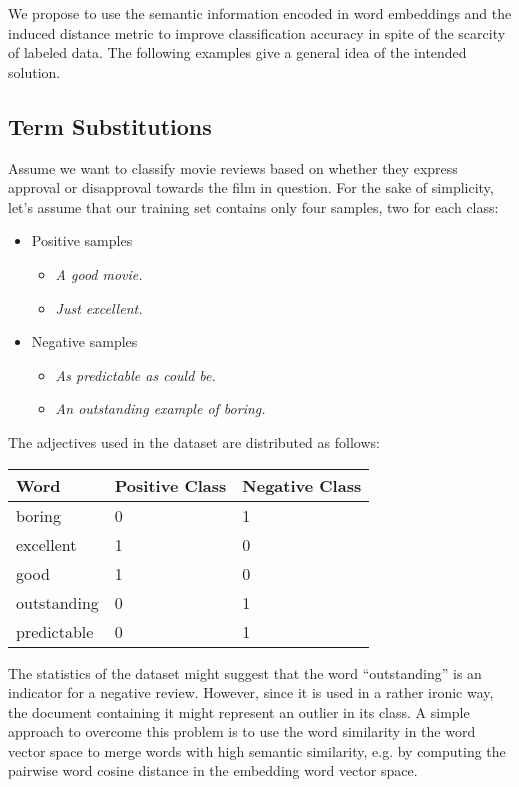 We propose to use the semantic information encoded in word embeddings and the
induced distance metric to improve classification accuracy in spite of the scarcity of labeled
data. The following examples give a general idea of the intended solution.

\subsection{Term Substitutions}
Assume we want to classify movie reviews based on whether they
express approval or disapproval towards the film in question. For the sake of
simplicity, let's assume that our training set contains only four samples, two
for each class:

\begin{itemize}
  \item Positive samples
  \begin{itemize}
	  \item \emph{A good movie.}
	  \item \emph{Just excellent.}
  \end{itemize}
  
  \item Negative samples
  \begin{itemize}
	  \item \emph{As predictable as could be.}
	  \item \emph{An outstanding example of boring.} 
  \end{itemize}
\end{itemize}

The adjectives used in the dataset are distributed as follows:

\begin{center}
\begin{tabular}{l|l|l}
\textbf{Word} & \textbf{Positive Class} & \textbf{Negative Class}  \\
\hline
boring & 0 & 1 \\
excellent & 1 & 0 \\
good & 1 & 0 \\
outstanding & 0 & 1 \\
predictable & 0 & 1 \\

\end{tabular}
\end{center}

The statistics of the dataset might suggest that the word ``outstanding'' is an
indicator for a negative review. However, since it is used in a rather ironic
way, the document containing it might represent an outlier in its class. A
simple approach to overcome this problem is to use the word similarity
in the word vector space to merge words with high semantic similarity, e.g. by
computing the pairwise word cosine distance in the embedding word vector space.

